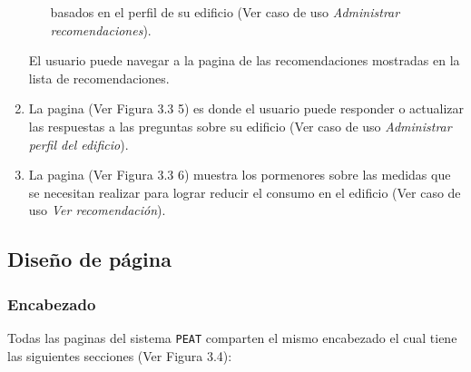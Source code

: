 \begin{enumerate}
\begin{itemize}
    basados en el perfil de su edificio (Ver caso de uso \textit{Administrar
      recomendaciones}).
  \end{itemize}
  El usuario puede navegar a la pagina 
  de las recomendaciones mostradas en la lista de recomendaciones.
\item La pagina  (Ver Figura 3.3 5) es
  donde el usuario puede responder o actualizar las respuestas a las preguntas
  sobre su edificio (Ver caso de uso \textit{Administrar perfil del edificio}).
\item La pagina  (Ver Figura 3.3 6) muestra los
  pormenores sobre las medidas que se necesitan realizar para lograr reducir
  el consumo en el edificio (Ver caso de uso \textit{Ver recomendación}).
\end{enumerate}


\subsection{Diseño de página}

\subsubsection{Encabezado}

Todas las paginas del sistema \texttt{PEAT} comparten el mismo encabezado
el cual tiene las siguientes secciones (Ver Figura 3.4):

